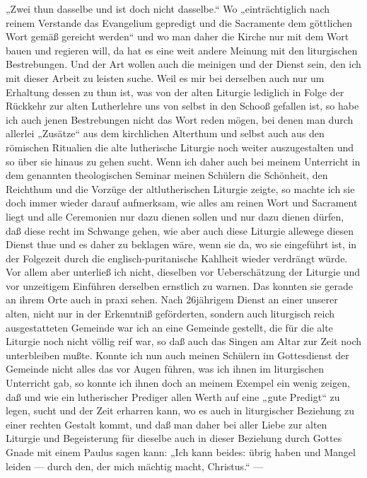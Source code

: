 „Zwei thun dasselbe und ist doch nicht dasselbe.“ Wo „einträchtiglich nach reinem Verstande das Evangelium gepredigt und die Sacramente dem göttlichen Wort gemäß gereicht werden“ und wo man daher die Kirche nur mit dem Wort bauen und regieren will, da hat es eine weit andere Meinung mit den liturgischen Bestrebungen. Und der Art wollen auch die meinigen und der Dienst sein, den ich mit dieser Arbeit zu leisten suche. Weil es mir bei derselben auch nur um Erhaltung dessen zu thun ist, was von der alten Liturgie lediglich in Folge der Rückkehr zur alten Lutherlehre uns von selbst in den Schooß gefallen ist, so habe ich auch jenen Bestrebungen nicht das Wort reden mögen, bei denen man durch allerlei „Zusätze“ aus dem kirchlichen Alterthum und selbst auch aus den römischen Ritualien die alte lutherische Liturgie noch weiter auszugestalten und so über sie hinaus zu gehen sucht. Wenn ich daher auch bei meinem Unterricht in dem genannten theologischen Seminar meinen Schülern die Schönheit, den Reichthum und die Vorzüge der altlutherischen Liturgie zeigte, so machte ich sie doch immer wieder darauf aufmerksam, wie alles am reinen Wort und Sacrament liegt und alle Ceremonien nur dazu dienen sollen und nur dazu dienen dürfen, daß diese recht im Schwange gehen, wie aber auch diese Liturgie allewege diesen Dienst thue und es daher zu beklagen wäre, wenn sie da, wo sie eingeführt ist, in der Folgezeit durch die englisch-puritanische Kahlheit wieder verdrängt würde. Vor allem aber unterließ ich nicht, dieselben vor Ueberschätzung der Liturgie und vor unzeitigem Einführen derselben ernstlich zu warnen. Das konnten sie gerade an ihrem Orte auch in praxi sehen. Nach 26jährigem Dienst an einer unserer alten, nicht nur in der Erkenntniß geförderten, sondern auch liturgisch reich ausgestatteten Gemeinde war ich an eine Gemeinde gestellt, die für die alte Liturgie noch nicht völlig reif war, so daß auch das Singen am Altar zur Zeit noch unterbleiben mußte. Konnte ich nun auch meinen Schülern im Gottesdienst der Gemeinde nicht alles das vor Augen führen, was ich ihnen im liturgischen Unterricht gab, so konnte ich ihnen doch an meinem Exempel ein wenig zeigen, daß und wie ein lutherischer Prediger
allen Werth auf eine „gute Predigt“ zu legen, sucht und der Zeit erharren kann, wo es auch in liturgischer Beziehung zu einer rechten Gestalt kommt, und daß man daher bei aller Liebe zur alten Liturgie und Begeisterung für dieselbe auch in dieser Beziehung durch Gottes Gnade mit einem Paulus sagen kann: „Ich kann beides: übrig haben und Mangel leiden — durch den, der mich mächtig macht, Christus.“ —


